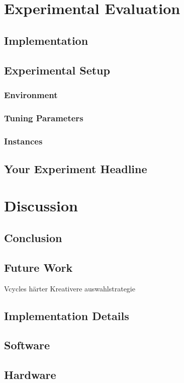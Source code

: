 \documentclass[a4paper,12pt,bibtotoc,titlepage, liststotoc,BCOR7mm,headsepline,pointlessnumbers]{scrbook}
\numberwithin{equation}{section}
\begin{document}
\chapter{Experimental Evaluation}
\section{Implementation}
\section{Experimental Setup}
\subsection{Environment}
\subsection{Tuning Parameters}
\subsection{Instances}
\section{Your Experiment Headline}
\chapter{Discussion}
\section{Conclusion}
\section{Future Work}
Vcycles härter
Kreativere auswahlstrategie

\clearpage
\begin{appendix}
\chapter{Implementation Details}
\section{Software}
\section{Hardware}
\end{appendix}


\end{document}
